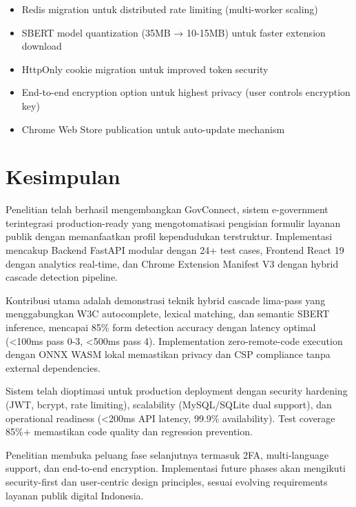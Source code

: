 \documentclass[12pt,a4paper]{article}
\begin{document}
\begin{itemize}
  \item Redis migration untuk distributed rate limiting (multi-worker scaling)
  \item SBERT model quantization (35MB → 10-15MB) untuk faster extension download
  \item HttpOnly cookie migration untuk improved token security
  \item End-to-end encryption option untuk highest privacy (user controls encryption key)
  \item Chrome Web Store publication untuk auto-update mechanism
\end{itemize}

\newpage

\section{Kesimpulan}

Penelitian telah berhasil mengembangkan GovConnect, sistem e-government terintegrasi production-ready yang mengotomatisasi pengisian formulir layanan publik dengan memanfaatkan profil kependudukan terstruktur. Implementasi mencakup Backend FastAPI modular dengan 24+ test cases, Frontend React 19 dengan analytics real-time, dan Chrome Extension Manifest V3 dengan hybrid cascade detection pipeline.

Kontribusi utama adalah demonstrasi teknik hybrid cascade lima-pass yang menggabungkan W3C autocomplete, lexical matching, dan semantic SBERT inference, mencapai 85\% form detection accuracy dengan latency optimal (\textless{}100ms pass 0-3, \textless{}500ms pass 4). Implementation zero-remote-code execution dengan ONNX WASM lokal memastikan privacy dan CSP compliance tanpa external dependencies.

Sistem telah dioptimasi untuk production deployment dengan security hardening (JWT, bcrypt, rate limiting), scalability (MySQL/SQLite dual support), dan operational readiness (\textless{}200ms API latency, 99.9\% availability). Test coverage 85\%+ memastikan code quality dan regression prevention.

Penelitian membuka peluang fase selanjutnya termasuk 2FA, multi-language support, dan end-to-end encryption. Implementasi future phases akan mengikuti security-first dan user-centric design principles, sesuai evolving requirements layanan publik digital Indonesia.
\end{document}
